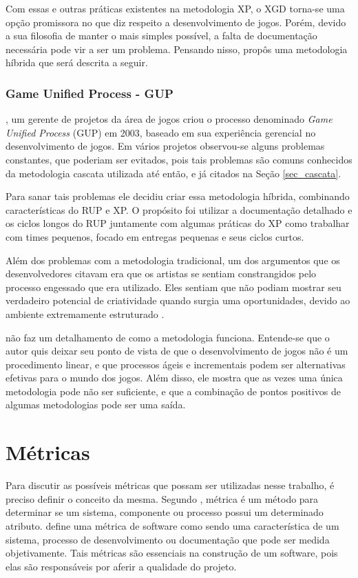 \documentclass[quali]{ppgccufscar}
\begin{document}
Com essas e outras práticas existentes na metodologia XP, o XGD torna-se uma opção promissora no que diz respeito a desenvolvimento de jogos. Porém, devido a sua filosofia de manter o mais simples possível, a falta de documentação necessária pode vir a ser um problema. Pensando nisso,  propôs uma metodologia híbrida que será descrita a seguir.


\subsubsection{Game Unified Process - GUP}

, um gerente de projetos da área de jogos criou o processo denominado \textit{Game Unified Process} (GUP) em 2003, baseado em sua experiência gerencial no desenvolvimento de jogos. Em vários projetos observou-se alguns problemas constantes, que poderiam ser evitados, pois tais problemas são comuns conhecidos da metodologia cascata utilizada até então, e já citados na Seção \ref{sec_cascata}. 

Para sanar tais problemas ele decidiu criar essa metodologia híbrida, combinando características do RUP e XP. O propósito foi utilizar a documentação detalhado e os ciclos longos do RUP juntamente com algumas práticas do XP como trabalhar com times pequenos, focado em entregas pequenas e seus ciclos curtos.

Além dos problemas com a metodologia tradicional, um dos argumentos que os desenvolvedores citavam era que os artistas se sentiam constrangidos pelo processo engessado que era utilizado.  Eles sentiam que não podiam mostrar seu verdadeiro potencial de criatividade quando surgia uma oportunidades, devido ao ambiente extremamente estruturado \cite{flood2003}.

 não faz um detalhamento de como a metodologia funciona. Entende-se que o autor quis deixar seu ponto de vista de que o desenvolvimento de jogos não é um procedimento linear, e que processos ágeis e incrementais podem ser alternativas efetivas para o mundo dos jogos. Além disso, ele mostra que as vezes uma única metodologia pode não ser suficiente, e que a combinação de pontos positivos de algumas metodologias pode ser uma saída.


\section{Métricas}

Para discutir as possíveis métricas que possam ser utilizadas nesse trabalho, é preciso definir o conceito da mesma. Segundo , métrica é um método para determinar se um sistema, componente ou processo possui um determinado atributo.  define uma métrica de software como sendo uma característica de um sistema, processo de desenvolvimento ou documentação que pode ser medida objetivamente. Tais métricas são essenciais na construção de um software, pois elas são responsáveis por aferir a qualidade do projeto.
\end{document}
